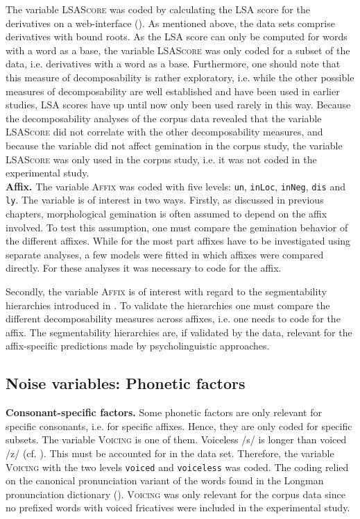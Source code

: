 The variable \textsc{LSAScore} was coded by calculating the LSA score for the derivatives on a web-interface (\citealt{UniversityofColoradoBoulder.25.06.2015}). %
As mentioned above, the data sets comprise derivatives with bound roots. As the LSA score can only be computed for words with a word as a base, the variable \textsc{LSAScore} was only coded for a subset of the data, i.e. derivatives with a word as a base. Furthermore, one should note that this measure of decomposability is rather exploratory, i.e. while the other possible measures of decomposability are well established and have been used in earlier studies, LSA scores have up until now only been used rarely in this way. Because the decomposability analyses of the corpus data revealed that the variable \textsc{LSAScore} did not correlate with the other decomposability measures, and because the variable did not affect gemination in the corpus study, the variable \textsc{LSAScore} was only used in the corpus study, i.e. it was not coded in the experimental study.\\

\textbf{Affix.} The variable \textsc{Affix} was coded with five levels: \texttt{un}, \texttt{inLoc}, \texttt{inNeg}, \texttt{dis} and \texttt{ly}. The variable is of interest in two ways. 
Firstly, as discussed in previous chapters, morphological gemination is often assumed to depend on the affix involved. To test this assumption, one must compare the gemination behavior of the different affixes. While for the most part affixes have to be investigated using separate analyses, a few models were fitted in which affixes were compared directly. For these analyses it was necessary to code for the affix.


Secondly, the variable \textsc{Affix} is of interest with regard to the segmentability hierarchies introduced in . To validate the hierarchies one must compare the different decomposability measures across affixes, i.e. one needs to code for the affix. The segmentability hierarchies are, if validated by the data, relevant for the affix-specific predictions made by psycholinguistic approaches. 


\subsection{Noise variables: Phonetic factors}

\textbf{Consonant-specific factors.} Some phonetic factors are only relevant for specific consonants, i.e. for specific affixes. Hence, they are only coded for specific subsets. The variable \textsc{Voicing} is one of them. Voiceless /s/ is longer than voiced /z/ (cf. \citealt{Umeda.1977}). This must be accounted for in the data set. Therefore, the variable \textsc{Voicing} with the two levels \texttt{voiced} and \texttt{voiceless} was coded. The coding relied on the canonical pronunciation variant of the words found in the Longman pronunciation dictionary (\citealt{Wells.2008}). \textsc{Voicing} was only relevant for the corpus data since no prefixed words with voiced fricatives were included in the experimental study.


